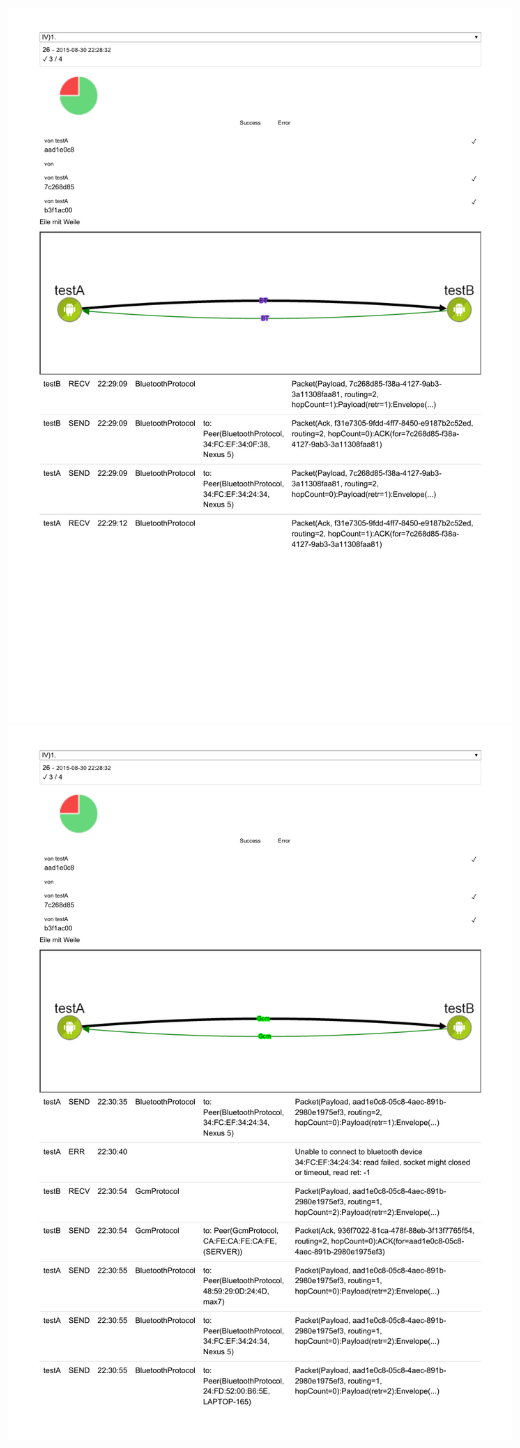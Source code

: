 \includegraphics[trim=0 90 0 0,clip,scale=0.8]{belege/manuelle-tests/netzwerk/Dashboardauszuege/Netzwerktest_IV-1b.pdf}
\clearpage
\includegraphics[trim=0 30 0 0,clip,scale=0.8]{belege/manuelle-tests/netzwerk/Dashboardauszuege/Netzwerktest_IV-1c.pdf}
\clearpage

